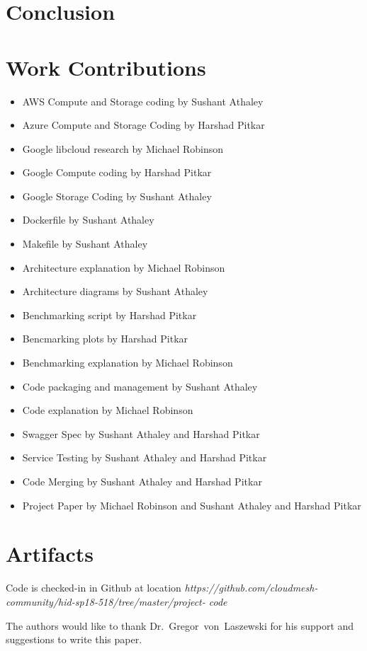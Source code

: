 \section{Conclusion}

\section{Work Contributions}
\begin{itemize}
\item
AWS Compute and Storage coding by Sushant Athaley
\item
Azure Compute and Storage Coding by Harshad Pitkar
\item
Google libcloud research by Michael Robinson
\item
Google Compute coding by Harshad Pitkar
\item
Google Storage Coding by Sushant Athaley
\item
Dockerfile by Sushant Athaley
\item
Makefile by Sushant Athaley
\item
Architecture explanation by Michael Robinson
\item
Architecture diagrams by Sushant Athaley
\item
Benchmarking script by Harshad Pitkar
\item
Bencmarking plots by Harshad Pitkar
\item
Benchmarking explanation by Michael Robinson
\item
Code packaging and management by Sushant Athaley
\item
Code explanation by Michael Robinson
\item
Swagger Spec by Sushant Athaley and Harshad Pitkar
\item
Service Testing by Sushant Athaley and Harshad Pitkar
\item
Code Merging by Sushant Athaley and Harshad Pitkar
\item
Project Paper by Michael Robinson and Sushant Athaley and Harshad Pitkar
\end{itemize}

\section{Artifacts}

Code is checked-in in Github at location
\emph{https://github.com/cloudmesh-community/hid-sp18-518/tree/master/project-
code}

\begin{acks}

  The authors would like to thank Dr.~Gregor~von~Laszewski for his
  support and suggestions to write this paper.

\end{acks}


 


